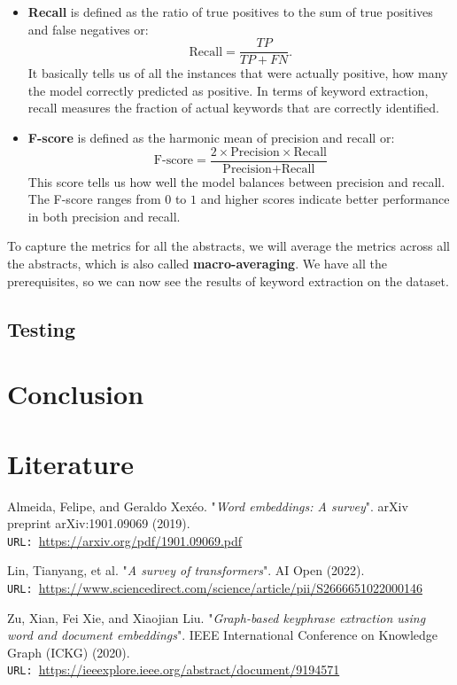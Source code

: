 \documentclass[12pt]{article}
\numberwithin{equation}{section}
\begin{document}
\begin{spacing}{1.5}
\begin{itemize}
		\item \textbf{Recall} is defined as the ratio of true positives to the sum of true positives and false negatives or:
		$$ \text{Recall} = \frac{TP}{TP + FN}. $$
		It basically tells us of all the instances that were actually positive, how many the model correctly predicted as positive. In terms of keyword extraction, recall measures the fraction of actual keywords that are correctly identified.
		\item \textbf{F-score} is defined as the harmonic mean of precision and recall or:
		$$ \text{F-score} = \frac{2 \times \text{Precision} \times \text{Recall}}{\text{Precision} + \text{Recall}} $$
		This score tells us how well the model balances between precision and recall. The F-score ranges from $0$ to $1$ and higher scores indicate better performance in both precision and recall.  
	\end{itemize}
	To capture the metrics for all the abstracts, we will average the metrics across all the abstracts, which is also called \textbf{macro-averaging}. We have all the prerequisites, so we can now see the results of keyword extraction on the dataset.

	\subsection{Testing}
	
	\newpage
	\section{Conclusion}
	
	\newpage
	\section{Literature}
	
	\begin{thebibliography}{8}
		Almeida, Felipe, and Geraldo Xexéo. "\textit{Word embeddings: A survey}". arXiv preprint arXiv:1901.09069 (2019). \\
		\texttt{URL: }\url{https://arxiv.org/pdf/1901.09069.pdf}
		
		Lin, Tianyang, et al. "\textit{A survey of transformers}". AI Open (2022).\\
		\texttt{URL: }\url{https://www.sciencedirect.com/science/article/pii/S2666651022000146}
		
		Zu, Xian, Fei Xie, and Xiaojian Liu. "\textit{Graph-based keyphrase extraction using word and document embeddings}". IEEE International Conference on Knowledge Graph (ICKG) (2020). \\
		\texttt{URL: }\url{https://ieeexplore.ieee.org/abstract/document/9194571}
		

\end{thebibliography}
\end{spacing}
\end{document}
